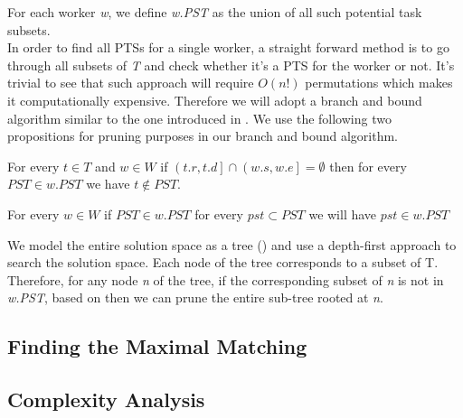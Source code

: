 For each worker \emph{w}, we define \emph{w.PST} as the union of all such potential task subsets.\\

In order to find all PTSs for a single worker, a straight forward method is to go through all subsets of \emph{T} and check whether it's a PTS for the worker or not. It's trivial to see that such approach will require $O(n!)$ permutations which makes it computationally expensive. Therefore we will adopt a branch and bound algorithm similar to the one introduced in \cite{deng13}. We use the following two propositions for pruning purposes in our branch and bound algorithm.

\begin{proposition}
For every $t \in T$ and $w \in W$ if $\left(t.r, t.d \right] \cap \left( w.s, w.e \right] = \emptyset$ then for every $PST \in w.PST$ we have $t \not\in PST$.
\end{proposition}

\begin{proposition}
For every $w \in W$ if $PST \in w.PST$ for every $pst \subset PST$ we will have $pst \in w.PST$
\end{proposition}

We model the entire solution space as a tree () and use a depth-first approach to search the solution space. Each node of the tree corresponds to a subset of T. Therefore, for any node \emph{n} of the tree, if the corresponding subset of \emph{n} is not in \emph{w.PST}, based on then we can prune the entire sub-tree rooted at \emph{n}.

\subsection{Finding the Maximal Matching}

\subsection{Complexity Analysis}